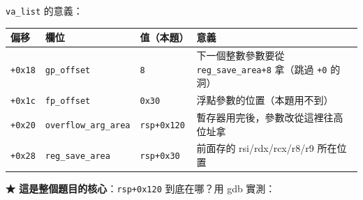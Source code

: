 \documentclass[10pt,a4paper]{article}
\newcounter{none}
\begin{document}
\texttt{va\_\allowbreak{}list} 的意義：

{\def\LTcaptype{none} %
\begin{longtable}[]{@{}
  >{\raggedright\arraybackslash}p{}
  >{\raggedright\arraybackslash}p{}
  >{\raggedright\arraybackslash}p{}
  >{\raggedright\arraybackslash}p{}@{}}
\toprule\noalign{}
\begin{minipage}[b]{\linewidth}\raggedright
偏移
\end{minipage} & \begin{minipage}[b]{\linewidth}\raggedright
欄位
\end{minipage} & \begin{minipage}[b]{\linewidth}\raggedright
值（本題）
\end{minipage} & \begin{minipage}[b]{\linewidth}\raggedright
意義
\end{minipage} \\
\midrule\noalign{}
\endhead
\bottomrule\noalign{}
\endlastfoot
\texttt{+0x18} & \texttt{gp\_\allowbreak{}offset} & \texttt{8} & 下一個整數參數要從
\texttt{reg\_\allowbreak{}save\_\allowbreak{}area+8} 拿（跳過 \texttt{+0} 的洞） \\
\texttt{+0x1c} & \texttt{fp\_\allowbreak{}offset} & \texttt{0x30} &
浮點參數的位置（本題用不到） \\
\texttt{+0x20} & \texttt{overflow\_\allowbreak{}arg\_\allowbreak{}area} & \texttt{rsp+0x120} &
暫存器用完後，參數改從這裡往高位址拿 \\
\texttt{+0x28} & \texttt{reg\_\allowbreak{}save\_\allowbreak{}area} & \texttt{rsp+0x30} & 前面存的
rsi/rdx/rcx/r8/r9 所在位置 \\
\end{longtable}
}

\textbf{★ 這是整個題目的核心}：\texttt{rsp+0x120} 到底在哪？用 gdb
實測：
\end{document}
